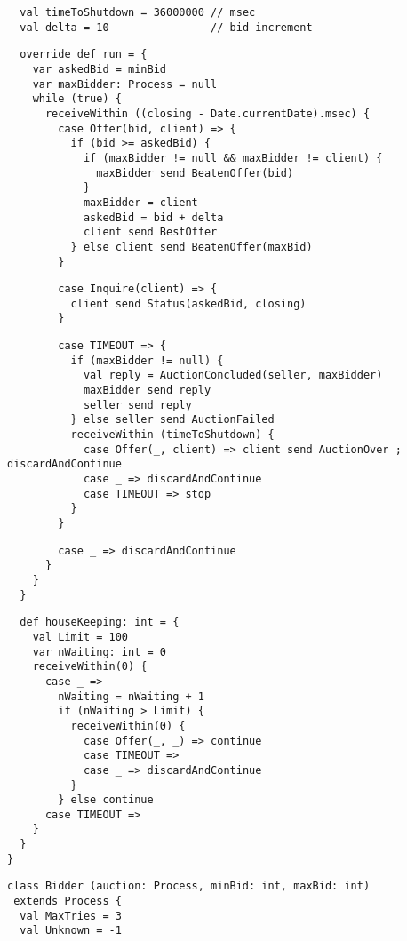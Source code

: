 {{\begin{lstlisting}
  val timeToShutdown = 36000000 // msec
  val delta = 10                // bid increment
\end{lstlisting}
\begin{lstlisting}
  override def run = {
    var askedBid = minBid
    var maxBidder: Process = null
    while (true) {
      receiveWithin ((closing - Date.currentDate).msec) {
        case Offer(bid, client) => {
          if (bid >= askedBid) {
            if (maxBidder != null && maxBidder != client) {
              maxBidder send BeatenOffer(bid)
            }
            maxBidder = client
            askedBid = bid + delta
            client send BestOffer
          } else client send BeatenOffer(maxBid)
        }
\end{lstlisting}
\begin{lstlisting}
        case Inquire(client) => {
          client send Status(askedBid, closing)
        }
\end{lstlisting}
\begin{lstlisting}
        case TIMEOUT => {
          if (maxBidder != null) {
            val reply = AuctionConcluded(seller, maxBidder)
            maxBidder send reply
            seller send reply
          } else seller send AuctionFailed
          receiveWithin (timeToShutdown) {
            case Offer(_, client) => client send AuctionOver ; discardAndContinue
            case _ => discardAndContinue
            case TIMEOUT => stop
          }
        }
\end{lstlisting}
\begin{lstlisting}
        case _ => discardAndContinue
      }
    }
  }
\end{lstlisting}
\begin{lstlisting}
  def houseKeeping: int = {
    val Limit = 100
    var nWaiting: int = 0
    receiveWithin(0) {
      case _ =>
        nWaiting = nWaiting + 1
        if (nWaiting > Limit) {
          receiveWithin(0) {
            case Offer(_, _) => continue
            case TIMEOUT =>
            case _ => discardAndContinue
          }
        } else continue
      case TIMEOUT =>
    }
  }
}
\end{lstlisting}
\begin{lstlisting}
class Bidder (auction: Process, minBid: int, maxBid: int)
 extends Process {
  val MaxTries = 3
  val Unknown = -1


\end{lstlisting}}}
